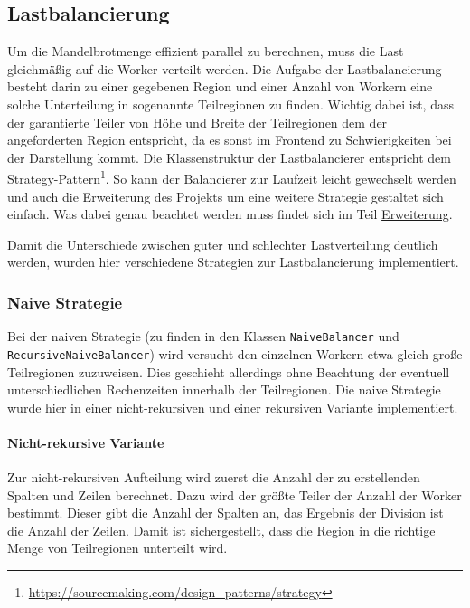 \begin{figure}
	
\end{figure}

\subsection{Lastbalancierung}\label{sec:load_balancing}
Um die Mandelbrotmenge effizient parallel zu berechnen, muss die Last gleichmäßig auf die Worker verteilt werden.
Die Aufgabe der Lastbalancierung besteht darin zu einer gegebenen Region und einer Anzahl von Workern eine solche Unterteilung in sogenannte Teilregionen zu finden.
Wichtig dabei ist, dass der garantierte Teiler von Höhe und Breite der Teilregionen dem der angeforderten Region entspricht, da es sonst im Frontend zu Schwierigkeiten bei der Darstellung kommt.
Die Klassenstruktur der Lastbalancierer entspricht dem Strategy-Pattern\footnote{\url{https://sourcemaking.com/design_patterns/strategy}}. So kann der Balancierer zur Laufzeit leicht gewechselt werden und auch die Erweiterung des Projekts um eine weitere Strategie gestaltet sich einfach.
Was dabei genau beachtet werden muss findet sich im Teil \hyperref[lastbalancierung_erweiterung]{Erweiterung}.


Damit die Unterschiede zwischen guter und schlechter Lastverteilung deutlich werden, wurden hier verschiedene Strategien zur Lastbalancierung implementiert.

\subsubsection{Naive Strategie}

Bei der naiven Strategie (zu finden in den Klassen \verb|NaiveBalancer| und \\ \verb|RecursiveNaiveBalancer|) wird versucht den einzelnen Workern etwa gleich große Teilregionen zuzuweisen.
Dies geschieht allerdings ohne Beachtung der eventuell unterschiedlichen Rechenzeiten innerhalb der Teilregionen.
Die naive Strategie wurde hier in einer nicht-rekursiven und einer rekursiven Variante implementiert.

\paragraph*{Nicht-rekursive Variante}\label{lastbalancierung_naiv}
Zur nicht-rekursiven Aufteilung wird zuerst die Anzahl der zu erstellenden Spalten und Zeilen berechnet.
Dazu wird der größte Teiler der Anzahl der Worker bestimmt. Dieser gibt die Anzahl der Spalten an, das Ergebnis der Division ist die Anzahl der Zeilen.
Damit ist sichergestellt, dass die Region in die richtige Menge von Teilregionen unterteilt wird.

